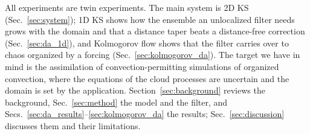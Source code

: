 All experiments are twin experiments. The main system is 2D KS
(Sec.~\ref{sec:system}); 1D KS shows how the ensemble an unlocalized filter
needs grows with the domain and that a distance taper beats a distance-free
correction (Sec.~\ref{sec:da_1d}), and Kolmogorov flow shows that the
filter carries over to chaos organized by a forcing
(Sec.~\ref{sec:kolmogorov_da}). The target we have in mind is the
assimilation of convection-permitting simulations of organized convection,
where the equations of the cloud processes are uncertain and the domain is
set by the application. Section~\ref{sec:background} reviews the
background, Sec.~\ref{sec:method} the model and the filter, and
Secs.~\ref{sec:da_results}--\ref{sec:kolmogorov_da} the results;
Sec.~\ref{sec:discussion} discusses them and their limitations.
